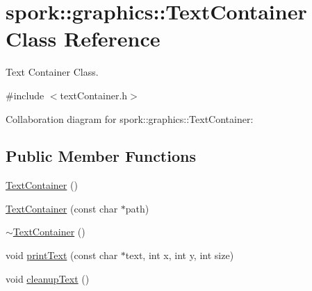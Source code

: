 \hypertarget{classspork_1_1graphics_1_1_text_container}{}\section{spork\+:\+:graphics\+:\+:Text\+Container Class Reference}
\label{classspork_1_1graphics_1_1_text_container}


Text Container Class.  




{\ttfamily \#include $<$text\+Container.\+h$>$}



Collaboration diagram for spork\+:\+:graphics\+:\+:Text\+Container\+:
\subsection*{Public Member Functions}
\begin{DoxyCompactItemize}
\item 
\hyperlink{classspork_1_1graphics_1_1_text_container_a71bb507bf5c76486928a2db2e00575e9}{Text\+Container} ()
\item 
\hyperlink{classspork_1_1graphics_1_1_text_container_a8a34a5a346d747e56cf4d41c98ed9d23}{Text\+Container} (const char $\ast$path)
\item 
\hyperlink{classspork_1_1graphics_1_1_text_container_ab22ce89b3d81e0e59a68648fdb2c8468}{$\sim$\+Text\+Container} ()
\item 
void \hyperlink{classspork_1_1graphics_1_1_text_container_a189aaec032d32035071532f3628203ba}{print\+Text} (const char $\ast$text, int x, int y, int size)
\item 
void \hyperlink{classspork_1_1graphics_1_1_text_container_a05f5fa9194b9ca558e33320e19fcfdbe}{cleanup\+Text} ()
\end{DoxyCompactItemize}
